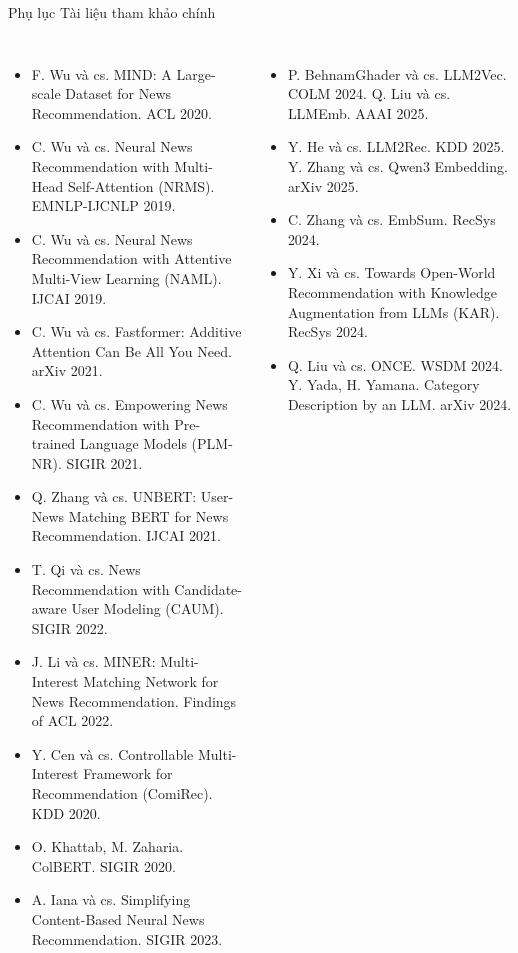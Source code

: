 \documentclass[aspectratio=169,t]{beamer}
\begin{document}
\begin{frame}[shrink]{Phụ lục \textperiodcentered{} Tài liệu tham khảo chính}
\tiny
\begin{columns}[T,onlytextwidth]
\begin{itemize}
  \setlength{\itemsep}{1pt}
  \item F. Wu và cs. MIND: A Large-scale Dataset for News Recommendation. ACL 2020.
  \item C. Wu và cs. Neural News Recommendation with Multi-Head Self-Attention (NRMS). EMNLP-IJCNLP 2019.
  \item C. Wu và cs. Neural News Recommendation with Attentive Multi-View Learning (NAML). IJCAI 2019.
  \item C. Wu và cs. Fastformer: Additive Attention Can Be All You Need. arXiv 2021.
  \item C. Wu và cs. Empowering News Recommendation with Pre-trained Language Models (PLM-NR). SIGIR 2021.
  \item Q. Zhang và cs. UNBERT: User-News Matching BERT for News Recommendation. IJCAI 2021.
  \item T. Qi và cs. News Recommendation with Candidate-aware User Modeling (CAUM). SIGIR 2022.
  \item J. Li và cs. MINER: Multi-Interest Matching Network for News Recommendation. Findings of ACL 2022.
  \item Y. Cen và cs. Controllable Multi-Interest Framework for Recommendation (ComiRec). KDD 2020.
  \item O. Khattab, M. Zaharia. ColBERT. SIGIR 2020.
  \item A. Iana và cs. Simplifying Content-Based Neural News Recommendation. SIGIR 2023.
\end{itemize}
\begin{itemize}
  \setlength{\itemsep}{1pt}
  \item P. BehnamGhader và cs. LLM2Vec. COLM 2024. \quad Q. Liu và cs. LLMEmb. AAAI 2025.
  \item Y. He và cs. LLM2Rec. KDD 2025. \quad Y. Zhang và cs. Qwen3 Embedding. arXiv 2025.
  \item C. Zhang và cs. EmbSum. RecSys 2024.
  \item Y. Xi và cs. Towards Open-World Recommendation with Knowledge Augmentation from LLMs (KAR). RecSys 2024.
  \item Q. Liu và cs. ONCE. WSDM 2024. \quad Y. Yada, H. Yamana. Category Description by an LLM. arXiv 2024.

\end{itemize}
\end{columns}
\end{frame}
\end{document}
